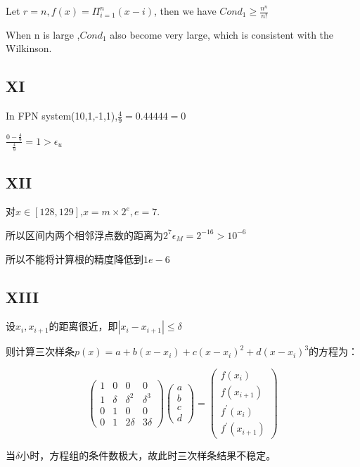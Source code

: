 \documentclass[12]{article}%
\begin{document}
            Let $r=n,f(x)=\Pi_{i=1}^n(x-i)$, then we have $Cond_1\ge\frac{n^n}{n!}$

            When n is large ,$Cond_1$ also become very large, which is consistent with the Wilkinson.

        \subsection{XI}
            In FPN system(10,1,-1,1),$\frac{4}{9}=0.44444=0$

            $\frac{0-\frac{4}{9}}{\frac{4}{9}}=1>\epsilon_u$

        \subsection{XII}
            对$x\in[128,129]$,$x=m\times 2^e,e=7$.

            所以区间内两个相邻浮点数的距离为$2^7\epsilon_M=2^{-16}>10^{-6}$

            所以不能将计算根的精度降低到$1e-6$
        
        \subsection{XIII}
            设$x_i,x_{i+1}$的距离很近，即$|x_i-x_{i+1}|\le \delta$

            则计算三次样条$p(x)=a+b(x-x_i)+c(x-x_i)^2+d(x-x_i)^3$的方程为：

            \begin{displaymath}
                \left( \begin{array}{cccc}
                    1 & 0 & 0& 0\\
                    1 & \delta&\delta^2&\delta^3\\
                    0 & 1 & 0 & 0\\
                    0 & 1 & 2\delta &3\delta
                 \end{array} \right)
                 \left( \begin{array}{cccc}
                    a\\
                    b\\
                    c\\
                    d
                 \end{array} \right)=
                 \left( \begin{array}{cccc}
                    f(x_i)\\
                    f(x_{i+1})\\
                    f^{'}(x_i)\\
                    f^{'}(x_{i+1})
                 \end{array} \right)
            \end{displaymath}

            当$\delta$小时，方程组的条件数极大，故此时三次样条结果不稳定。
\end{document}

